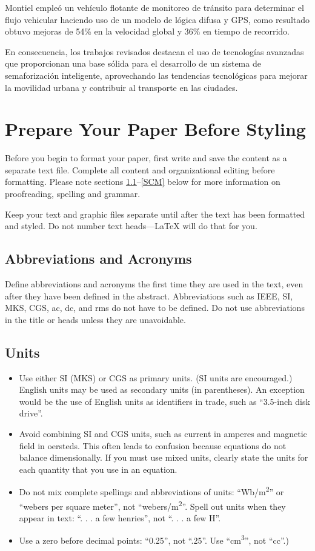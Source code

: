 \documentclass[conference]{IEEEtran}
\begin{document}
Montiel \cite{Sergio2021} empleó un vehículo flotante de monitoreo de tránsito para determinar el flujo vehicular haciendo uso de un modelo de lógica difusa y GPS, como resultado obtuvo mejoras de 54\% en la velocidad global y 36\% en tiempo de recorrido.

En consecuencia, los trabajos revisados destacan el uso de tecnologías avanzadas que proporcionan una base sólida para el desarrollo de un sistema de semaforización inteligente, aprovechando las tendencias tecnológicas para mejorar la movilidad urbana y contribuir al transporte en las ciudades.

\section{Prepare Your Paper Before Styling}
Before you begin to format your paper, first write and save the content as a 
separate text file. Complete all content and organizational editing before 
formatting. Please note sections \ref{AA}--\ref{SCM} below for more information on 
proofreading, spelling and grammar.

Keep your text and graphic files separate until after the text has been 
formatted and styled. Do not number text heads---{\LaTeX} will do that 
for you.

\subsection{Abbreviations and Acronyms}\label{AA}
Define abbreviations and acronyms the first time they are used in the text, 
even after they have been defined in the abstract. Abbreviations such as 
IEEE, SI, MKS, CGS, ac, dc, and rms do not have to be defined. Do not use 
abbreviations in the title or heads unless they are unavoidable.

\subsection{Units}
\begin{itemize}
\item Use either SI (MKS) or CGS as primary units. (SI units are encouraged.) English units may be used as secondary units (in parentheses). An exception would be the use of English units as identifiers in trade, such as ``3.5-inch disk drive''.
\item Avoid combining SI and CGS units, such as current in amperes and magnetic field in oersteds. This often leads to confusion because equations do not balance dimensionally. If you must use mixed units, clearly state the units for each quantity that you use in an equation.
\item Do not mix complete spellings and abbreviations of units: ``Wb/m\textsuperscript{2}'' or ``webers per square meter'', not ``webers/m\textsuperscript{2}''. Spell out units when they appear in text: ``. . . a few henries'', not ``. . . a few H''.
\item Use a zero before decimal points: ``0.25'', not ``.25''. Use ``cm\textsuperscript{3}'', not ``cc''.)
\end{itemize}
\end{document}
